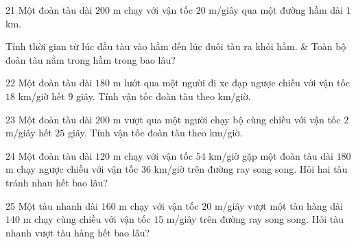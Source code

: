 \gap
\begin{probbox}{21}{\relax}
Một đoàn tàu dài $200$ m chạy với vận tốc $20$ m/giây qua một đường hầm dài $1$ km.
\begin{cols2}
 Tính thời gian từ lúc đầu tàu vào hầm đến lúc đuôi tàu ra khỏi hầm. &  Toàn bộ đoàn tàu nằm trong hầm trong bao lâu?
\end{cols2}
\end{probbox}
\gap
\begin{probbox}{22}{\relax}
Một đoàn tàu dài $180$ m lướt qua một người đi xe đạp ngược chiều với vận tốc $18$ km/giờ hết $9$ giây. Tính vận tốc đoàn tàu theo km/giờ.
\end{probbox}
\gap
\begin{probbox}{23}{\relax}
Một đoàn tàu dài $200$ m vượt qua một người chạy bộ cùng chiều với vận tốc $2$ m/giây hết $25$ giây. Tính vận tốc đoàn tàu theo km/giờ.
\end{probbox}
\gap
\begin{probbox}{24}{\relax}
Một đoàn tàu dài $120$ m chạy với vận tốc $54$ km/giờ gặp một đoàn tàu dài $180$ m chạy ngược chiều với vận tốc $36$ km/giờ trên đường ray song song. Hỏi hai tàu tránh nhau hết bao lâu?
\end{probbox}
\gap
\begin{probbox}{25}{\relax}
Một tàu nhanh dài $160$ m chạy với vận tốc $20$ m/giây vượt một tàu hàng dài $140$ m chạy cùng chiều với vận tốc $15$ m/giây trên đường ray song song. Hỏi tàu nhanh vượt tàu hàng hết bao lâu?
\end{probbox}
